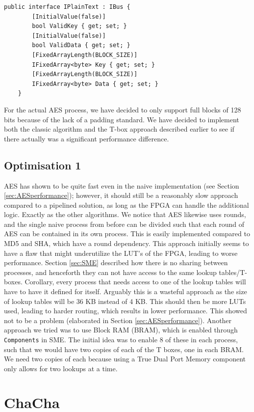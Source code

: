 \documentclass[a4paper, openany]{book}
\begin{document}
\begin{Verbatim}[fontsize=\footnotesize]
    public interface IPlainText : IBus {
        [InitialValue(false)]
        bool ValidKey { get; set; }
        [InitialValue(false)]
        bool ValidData { get; set; }
        [FixedArrayLength(BLOCK_SIZE)]
        IFixedArray<byte> Key { get; set; }
        [FixedArrayLength(BLOCK_SIZE)]
        IFixedArray<byte> Data { get; set; }
    }
\end{Verbatim}
For the actual AES process, we have decided to only support full blocks of 128 bits because of the lack of a padding standard. We have decided to implement both the classic algorithm and the T-box approach described earlier to see if there actually was a significant performance difference.

\subsection{Optimisation 1}
\label{AESopt}
AES has shown to be quite fast even in the naive implementation (see Section \ref{sec:AESperformance}); however, it should still be a reasonably slow approach compared to a pipelined solution, as long as the FPGA can handle the additional logic. Exactly as the other algorithms. We notice that AES likewise uses rounds, and the single naive process from before can be divided such that each round of AES can be contained in its own process. This is easily implemented compared to MD5 and SHA, which have a round dependency. This approach initially seems to have a flaw that might underutilize the LUT's of the FPGA, leading to worse performance. Section \ref{sec:SME} described how there is no sharing between processes, and henceforth they can not have access to the same lookup tables/T-boxes. Corollary, every process that needs access to one of the lookup tables will have to have it defined for itself. Arguably this is a wasteful approach as the size of lookup tables will be 36 KB instead of 4 KB. This should then be more LUTs used, leading to harder routing, which results in lower performance. This showed not to be a problem (elaborated in Section \ref{sec:AESperformance}). Another approach we tried was to use Block RAM (BRAM), which is enabled through \texttt{Components} in SME. The initial idea was to enable 8 of these in each process, such that we would have two copies of each of the T boxes, one in each BRAM. We need two copies of each because using a True Dual Port Memory component only allows for two lookups at a time.
\section{ChaCha}
\label{sec:orgb2fe460}
\end{document}
